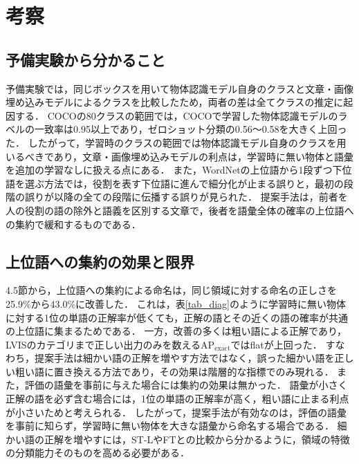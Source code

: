 \section{考察}
\subsection{予備実験から分かること}
予備実験では，同じボックスを用いて物体認識モデル自身のクラスと文章・画像埋め込みモデルによるクラスを比較したため，両者の差は全てクラスの推定に起因する．
COCOの80クラスの範囲では，COCOで学習した物体認識モデルのラベルの一致率は0.95以上であり，ゼロショット分類の0.56〜0.58を大きく上回った．
したがって，学習時のクラスの範囲では物体認識モデル自身のクラスを用いるべきであり，文章・画像埋め込みモデルの利点は，学習時に無い物体と語彙を追加の学習なしに扱える点にある．
また，WordNetの上位語から1段ずつ下位語を選ぶ方法では，役割を表す下位語に進んで細分化が止まる誤りと，最初の段階の誤りが以降の全ての段階に伝播する誤りが見られた．
提案手法は，前者を人の役割の語の除外と語義を区別する文章で，後者を語彙全体の確率の上位語への集約で緩和するものである．

\subsection{上位語への集約の効果と限界}
4.5節から，上位語への集約による命名は，同じ領域に対する命名の正しさを25.9\%から43.0\%に改善した．
これは，表\ref{tab_diag}のように学習時に無い物体に対する1位の単語の正解率が低くても，正解の語とその近くの語の確率が共通の上位語に集まるためである．
一方，改善の多くは粗い語による正解であり，LVISのカテゴリまで正しい出力のみを数えるAP$ _{\mathrm{exact}} $ではflatが上回った．
すなわち，提案手法は細かい語の正解を増やす方法ではなく，誤った細かい語を正しい粗い語に置き換える方法であり，その効果は階層的な指標でのみ現れる．
また，評価の語彙を事前に与えた場合には集約の効果は無かった．
語彙が小さく正解の語を必ず含む場合には，1位の単語の正解率が高く，粗い語に止まる利点が小さいためと考えられる．
したがって，提案手法が有効なのは，評価の語彙を事前に知らず，学習時に無い物体を大きな語彙から命名する場合である．
細かい語の正解を増やすには，ST-LやFTとの比較から分かるように，領域の特徴の分類能力そのものを高める必要がある．

